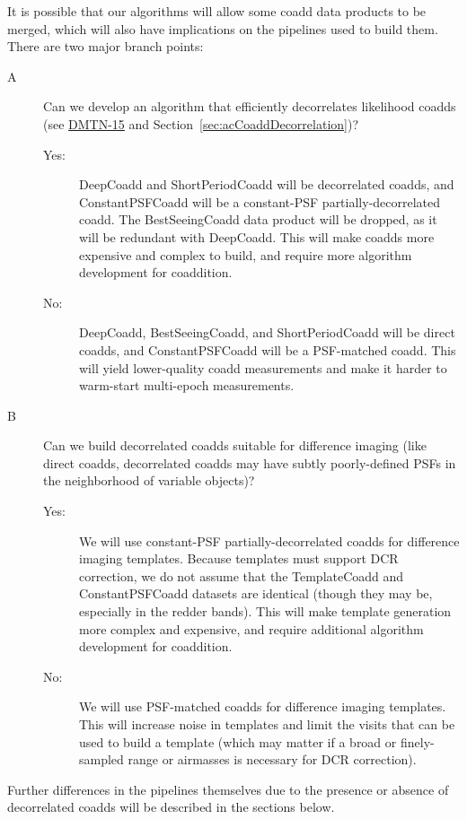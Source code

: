 It is possible that our algorithms will allow some coadd data products to be merged, which will also have implications on the pipelines used to build them.  There are two major branch points:
\begin{description}
\item[A] Can we develop an algorithm that efficiently decorrelates likelihood coadds (see \href{http://dmtn-015.lsst.io/en/latest/}{DMTN-15} and Section~\ref{sec:acCoaddDecorrelation})?
  \begin{description}
  \item[Yes:] DeepCoadd and ShortPeriodCoadd will be decorrelated coadds, and ConstantPSFCoadd will be a constant-PSF partially-decorrelated coadd.  The BestSeeingCoadd data product will be dropped, as it will be redundant with DeepCoadd.  This will make coadds more expensive and complex to build, and require more algorithm development for coaddition.
  \item[No:] DeepCoadd, BestSeeingCoadd, and ShortPeriodCoadd will be direct coadds, and ConstantPSFCoadd will be a PSF-matched coadd.  This will yield lower-quality coadd measurements and make it harder to warm-start multi-epoch measurements.
  \end{description}
\item[B] Can we build decorrelated coadds suitable for difference imaging (like direct coadds, decorrelated coadds may have subtly poorly-defined PSFs in the neighborhood of variable objects)?
  \begin{description}
  \item[Yes:] We will use constant-PSF partially-decorrelated coadds for difference imaging templates.  Because templates must support DCR correction, we do not assume that the TemplateCoadd and ConstantPSFCoadd datasets are identical (though they may be, especially in the redder bands).  This will make template generation more complex and expensive, and require additional algorithm development for coaddition.
  \item[No:] We will use PSF-matched coadds for difference imaging templates.  This will increase noise in templates and limit the visits that can be used to build a template (which may matter if a broad or finely-sampled range or airmasses is necessary for DCR correction).
  \end{description}
\end{description}
Further differences in the pipelines themselves due to the presence or absence of decorrelated coadds will be described in the sections below.

